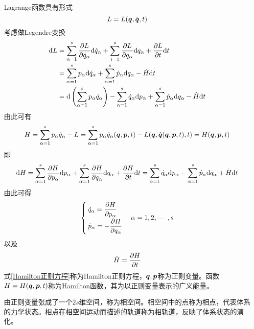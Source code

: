 Lagrange函数具有形式
\begin{equation*}
	L = L(\boldsymbol{q},\dot{\boldsymbol{q}},t)
\end{equation*}
考虑做Legendre变换
\begin{align*}
	\mathrm{d} L & = \sum_{\alpha=1}^s \frac{\partial L}{\partial \dot{q}_\alpha} \mathrm{d} \dot{q}_\alpha + \sum_{i=1}^s \frac{\partial L}{\partial q_\alpha} \mathrm{d} q_\alpha + \frac{\partial L}{\partial t} \mathrm{d} t \\
	& = \sum_{\alpha=1}^s p_\alpha \mathrm{d} \dot{q}_\alpha + \sum_{\alpha=1}^s \dot{p}_\alpha \mathrm{d} q_\alpha - \dot{H} \mathrm{d} t \\
	& = \mathrm{d} \left(\sum_{\alpha=1}^s p_\alpha \dot{q}_\alpha \right) - \sum_{\alpha=1}^s \dot{q}_\alpha \mathrm{d} p_\alpha + \sum_{\alpha=1}^s \dot{p}_\alpha \mathrm{d}q_\alpha - \dot{H} \mathrm{d} t
\end{align*}
由此可有
\begin{equation}
	H = \sum_{\alpha=1}^s p_\alpha \dot{q}_\alpha - L = \sum_{\alpha=1}^s p_\alpha \dot{q}_\alpha(\boldsymbol{q},\boldsymbol{p},t) - L(\boldsymbol{q},\dot{\boldsymbol{q}}(\boldsymbol{q},\boldsymbol{p},t),t) = H(\boldsymbol{q},\boldsymbol{p},t)
\end{equation}
即
\begin{equation*}
	\mathrm{d} H = \sum_{\alpha=1}^s \frac{\partial H}{\partial p_\alpha} \mathrm{d} p_\alpha + \sum_{\alpha=1}^s \frac{\partial H}{\partial q_\alpha} \mathrm{d} q_\alpha + \frac{\partial H}{\partial t} \mathrm{d} t = \sum_{\alpha=1}^s \dot{q}_\alpha \mathrm{d} p_\alpha - \sum_{\alpha=1}^s \dot{p}_\alpha \mathrm{d} q_\alpha + \dot{H} \mathrm{d} t
\end{equation*}
由此可得
\begin{equation}
	\begin{cases}
		\dot{q}_\alpha = \dfrac{\partial H}{\partial p_\alpha} \\[1.5ex]
		\dot{p}_\alpha = -\dfrac{\partial H}{\partial q_\alpha} 
	\end{cases}
	\alpha = 1,2,\cdots,s
	\label{Hamilton正则方程}
\end{equation}
以及
\begin{equation}
	\dot{H} = \frac{\partial H}{\partial t}
\end{equation}
式\eqref{Hamilton正则方程}称为{\heiti Hamilton正则方程}，$\boldsymbol{q},\boldsymbol{p}$称为{\heiti 正则变量}。函数$H = H(\boldsymbol{q},\boldsymbol{p},t)$称为{\heiti Hamilton函数}，其为以正则变量表示的广义能量。

由正则变量张成了一个$2s$维空间，称为{\heiti 相空间}。相空间中的点称为{\heiti 相点}，代表体系的力学状态。相点在相空间运动而描述的轨道称为{\heiti 相轨道}，反映了体系状态的演化。

